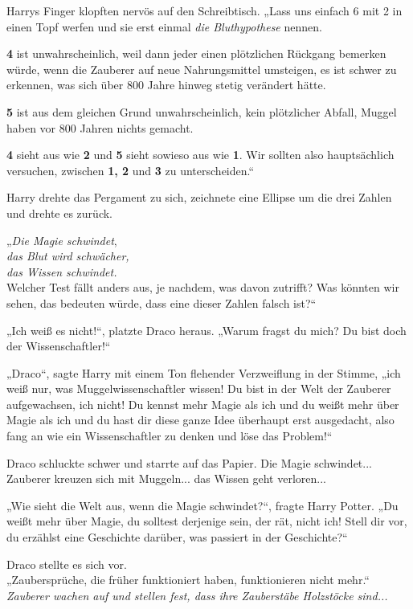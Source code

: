 {Harrys Finger klopften nervös auf den Schreibtisch. „Lass uns einfach 6 mit 2 in einen Topf werfen und sie erst einmal \emph{die Bluthypothese} nennen.

\textbf{4} ist unwahrscheinlich, weil dann jeder einen plötzlichen Rückgang bemerken würde, wenn die Zauberer auf neue Nahrungsmittel umsteigen, es ist schwer zu erkennen, was sich über 800 Jahre hinweg stetig verändert hätte.

\textbf{5} ist aus dem gleichen Grund unwahrscheinlich, kein plötzlicher Abfall, Muggel haben vor 800 Jahren nichts gemacht.

\textbf{4} sieht aus wie \textbf{2} und \textbf{5} sieht sowieso aus wie \textbf{1}. Wir sollten also hauptsächlich versuchen, zwischen \textbf{1, 2} und \textbf{3} zu unterscheiden.“

Harry drehte das Pergament zu sich, zeichnete eine Ellipse um die drei Zahlen und drehte es zurück.

„\emph{Die Magie schwindet},\\ \emph{das Blut wird schwächer,}\\ \emph{das Wissen schwindet.}\\ Welcher Test fällt anders aus, je nachdem, was davon zutrifft? Was könnten wir sehen, das bedeuten würde, dass eine dieser Zahlen falsch ist?“

„Ich weiß es nicht!“, platzte Draco heraus. „Warum fragst du mich? Du bist doch der Wissenschaftler!“

„Draco“, sagte Harry mit einem Ton flehender Verzweiflung in der Stimme, „ich weiß nur, was Muggelwissenschaftler wissen! Du bist in der Welt der Zauberer aufgewachsen, ich nicht! Du kennst mehr Magie als ich und du weißt mehr über Magie als ich und du hast dir diese ganze Idee überhaupt erst ausgedacht, also fang an wie ein Wissenschaftler zu denken und löse das Problem!“

Draco schluckte schwer und starrte auf das Papier. Die Magie schwindet... Zauberer kreuzen sich mit Muggeln... das Wissen geht verloren...

„Wie sieht die Welt aus, wenn die Magie schwindet?“, fragte Harry Potter. „Du weißt mehr über Magie, du solltest derjenige sein, der rät, nicht ich! Stell dir vor, du erzählst eine Geschichte darüber, was passiert in der Geschichte?“

Draco stellte es sich vor.\\ „Zaubersprüche, die früher funktioniert haben, funktionieren nicht mehr.“\\ \emph{Zauberer wachen auf und stellen fest, dass ihre Zauberstäbe Holzstöcke sind...}

}
